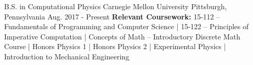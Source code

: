 \begin{cventries}
  \cventry
    {B.S. in Computational Physics}
    {Carnegie Mellon University}
    {Pittsburgh, Pennsylvania}
    {Aug. 2017 - Present}
    {\textbf{Relevant Coursework:} 15-112 -- Fundamentals of Programming and Computer Science | 15-122 -- Principles of Imperative Computation | Concepts of Math -- Introductory Discrete Math Course | Honors Physics 1 | Honors Physics 2 | Experimental Physics | Introduction to Mechanical Engineering
    }
    {
    }
\end{cventries}
